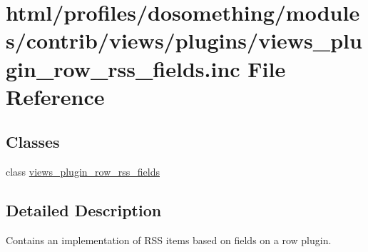 \hypertarget{views__plugin__row__rss__fields_8inc}{
\section{html/profiles/dosomething/modules/contrib/views/plugins/views\_\-plugin\_\-row\_\-rss\_\-fields.inc File Reference}
\label{views__plugin__row__rss__fields_8inc}
}
\subsection*{Classes}
\begin{DoxyCompactItemize}
\item 
class \hyperlink{classviews__plugin__row__rss__fields}{views\_\-plugin\_\-row\_\-rss\_\-fields}
\end{DoxyCompactItemize}


\subsection{Detailed Description}
Contains an implementation of RSS items based on fields on a row plugin. 
